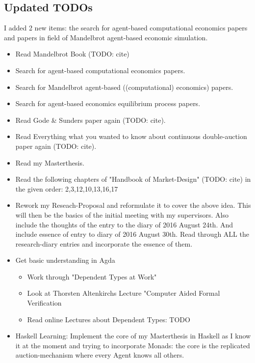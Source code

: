\subsection*{Updated TODOs}
I added 2 new items: the search for agent-based computational economics papers and papers in field of Mandelbrot agent-based economic simulation.

\begin{itemize}
\item Read Mandelbrot Book (TODO: cite)
\item Search for agent-based computational economics papers.
\item Search for Mandelbrot agent-based ((computational) economics) papers.
\item Search for agent-based economics equilibrium process papers.
\item Read Gode \& Sunders paper again (TODO: cite).
\item Read Everything what you wanted to know about continuous double-auction paper again (TODO: cite).
\item Read my Masterthesis.
\item Read the following chapters of "Handbook of Market-Design" (TODO: cite) in the given order: 2,3,12,10,13,16,17
\item Rework my Reseach-Proposal and reformulate it to cover the above idea. 
This will then be the basics of the initial meeting with my supervisors. Also include the thoughts of the entry to the diary of 2016 August 24th. And include essence of entry to diary of 2016 August 30th. Read through ALL the research-diary entries and incorporate the essence of them.
\item Get basic understanding in Agda 
	\begin{itemize}
	\item Work through "Dependent Types at Work"
	\item Look at Thorsten Altenkirchs Lecture "Computer Aided Formal Verification
	\item Read online Lectures about Dependent Types: TODO
	\end{itemize}
\item Haskell Learning: Implement the core of my Masterthesis in Haskell as I know it at the moment and trying to incorporate Monads: the core is the replicated auction-mechanism where every Agent knows all others.
\end{itemize}